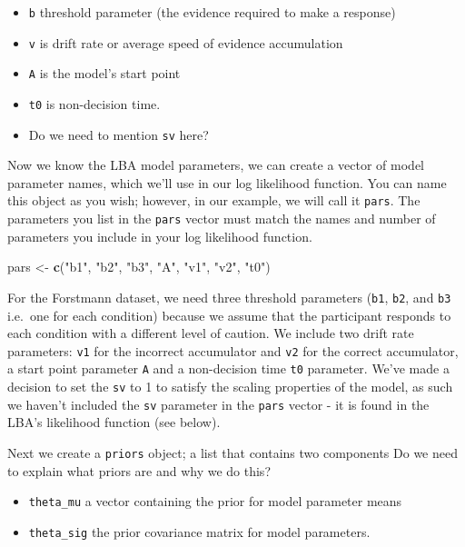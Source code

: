\documentclass[]{book}
\newenvironment{Shaded}{\begin{snugshade}}{\end{snugshade}}
\newcommand{\KeywordTok}[1]{\textcolor[rgb]{0.13,0.29,0.53}{\textbf{#1}}}
\newcommand{\NormalTok}[1]{#1}
\newcommand{\StringTok}[1]{\textcolor[rgb]{0.31,0.60,0.02}{#1}}
\providecommand{\tightlist}{%
  \setlength{\itemsep}{0pt}\setlength{\parskip}{0pt}}
\begin{document}
\begin{itemize}
\tightlist
\item
  \texttt{b} threshold parameter (the evidence required to make a response)
\item
  \texttt{v} is drift rate or average speed of evidence accumulation
\item
  \texttt{A} is the model's start point
\item
  \texttt{t0} is non-decision time.
\item
  Do we need to mention \texttt{sv} here? 
\end{itemize}

Now we know the LBA model parameters, we can create a vector of model parameter names, which we'll use in our log likelihood function. You can name this object as you wish; however, in our example, we will call it \texttt{pars}. The parameters you list in the \texttt{pars} vector must match the names and number of parameters you include in your log likelihood function.

\begin{Shaded}
\begin{Highlighting}[]
\NormalTok{pars <-}\StringTok{ }\KeywordTok{c}\NormalTok{(}\StringTok{"b1"}\NormalTok{, }\StringTok{"b2"}\NormalTok{, }\StringTok{"b3"}\NormalTok{, }\StringTok{"A"}\NormalTok{, }\StringTok{"v1"}\NormalTok{, }\StringTok{"v2"}\NormalTok{, }\StringTok{"t0"}\NormalTok{)}
\end{Highlighting}
\end{Shaded}

For the Forstmann dataset, we need three threshold parameters (\texttt{b1}, \texttt{b2}, and \texttt{b3} i.e.~one for each condition) because we assume that the participant responds to each condition with a different level of caution. We include two drift rate parameters: \texttt{v1} for the incorrect accumulator and \texttt{v2} for the correct accumulator, a start point parameter \texttt{A} and a non-decision time \texttt{t0} parameter. We've made a decision to set the \texttt{sv} to 1 to satisfy the scaling properties of the model, as such we haven't included the \texttt{sv} parameter in the \texttt{pars} vector - it is found in the LBA's likelihood function (see below).

Next we create a \texttt{priors} object; a list that contains two components Do we need to explain what priors are and why we do this?

\begin{itemize}
\tightlist
\item
  \texttt{theta\_mu} a vector containing the prior for model parameter means
\item
  \texttt{theta\_sig} the prior covariance matrix for model parameters.
\end{itemize}
\end{document}
